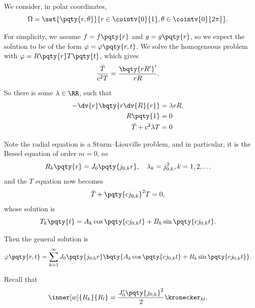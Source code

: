 {We consider, in polar coordinates,
\begin{equation}
    \Omega = \set{\pqty{r, \theta}}{r \in \cointv{0}{1}, \theta \in \cointv{0}{2 \pi}}.
\end{equation}

For simplicity, we assume \(f = f\pqty{r}\) and \(g = g\pqty{r}\), so we expect the solution to be of the form \(\varphi = \varphi\pqty{r, t}\). We solve the homogeneous problem with \(\varphi = R\pqty{r} T\pqty{t}\), which gives
\begin{equation}
    \frac{\ddot{T}}{c^2 T} = \frac{\bqty{r R'}'}{rR}.
\end{equation}

So there is some \(\lambda \in \RR\), such that
\begin{subequations}
    \begin{align}
        - \dv{r} \bqty{r \dv{R}{r}} &= \lambda r R, \\
        R\pqty{1} &= 0 \\
        \ddot{T}+ c^2 \lambda T &= 0
    \end{align}
\end{subequations}

Note the radial equation is a Sturm--Liouville problem, and in particular, it is the Bessel equation of order \(m = 0\), so
\begin{equation}
    R_k \pqty{r} = J_0 \pqty{j_{0, k} r}, \quad \lambda_k = j_{0, k}^2, k = 1, 2, \ldots
\end{equation}
and the \(T\) equation now becomes
\begin{equation}
    \ddot{T} + \pqty{c j_{0, k}}^2 T = 0,
\end{equation}
whose solution is
\begin{equation}
    T_k\pqty{t} = A_k \cos \pqty{c j_{0, k} t} + B_k \sin \pqty{c j_{0, k} t}.
\end{equation}

Then the general solution is
\begin{equation}
    \varphi\pqty{r, t} = \sum_{k = 1}^{\infty} J_0 \pqty{j_{0, k} r} \bqty{A_k \cos \pqty{c j_{0, k} t} + B_k \sin \pqty{c j_{0, k} t}}.
\end{equation}

\small

Recall that \begin{equation}
    \inner[w]{R_k}{R_l} = \frac{J_0' \pqty{j_{0, k}}^2}{2} \kronecker_{kl}.
\end{equation}

}
